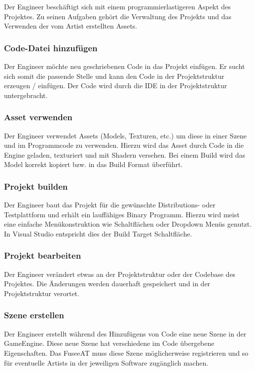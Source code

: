 \documentclass[pagesize, paper=a4, fontsize=12pt, titlepage=true, headings=small, headnosepline, abstractoff, liststotoc, nochapterprefix, plainheadsepline, twoside]{scrreprt}
\begin{document}
Der Engineer beschäftigt sich mit einem programmierlastigeren Aspekt des Projektes. Zu seinen Aufgaben gehört die Verwaltung des Projekts und das Verwenden der vom Artist erstellten Assets.

\subsubsection{Code-Datei hinzufügen}
Der Engineer möchte neu geschriebenen Code in das Projekt einfügen. Er sucht sich somit die passende Stelle und kann den Code in der Projektstruktur erzeugen / einfügen. Der Code wird durch die IDE in der Projektstruktur untergebracht.

\subsubsection{Asset verwenden}
Der Engineer verwendet Assets (Models, Texturen, etc.) um diese in einer Szene und im Programmcode zu verwenden. Hierzu wird das Asset durch Code in die Engine geladen, texturiert und mit Shadern versehen. Bei einem Build wird das Model korrekt kopiert bzw. in das Build Format überführt.

\subsubsection{Projekt builden}
Der Engineer baut das Projekt für die gewünschte Distributions- oder Testplattform und erhält ein lauffähiges Binary Programm. Hierzu wird meist eine einfache Menükonstruktion wie Schaltflächen oder Dropdown Menüs genutzt. In Visual Studio entspricht dies der Build Target Schaltfläche.

\subsubsection{Projekt bearbeiten}
Der Engineer verändert etwas an der Projektstruktur oder der Codebase des Projektes. Die Änderungen werden dauerhaft gespeichert und in der Projektstruktur verortet.

\subsubsection{Szene erstellen}
Der Engineer erstellt während des Hinzufügens von Code eine neue Szene in der GameEngine. Diese neue Szene hat verschiedene im Code übergebene Eigenschaften. Das FuseeAT muss diese Szene möglicherweise registrieren und so für eventuelle Artists in der jeweiligen Software zugänglich machen.
\end{document}
